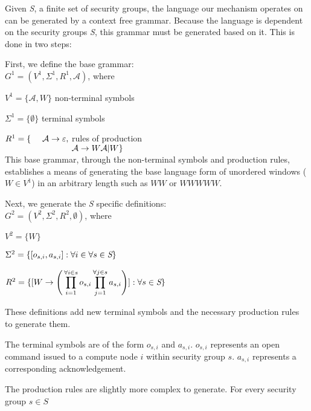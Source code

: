 \documentclass{article}
\newcommand{\tab}{\hspace*{2em}}
\begin{document}
Given \emph{S}, a finite set of security groups, the language our mechanism operates on can be generated by a context free grammar. Because the language is dependent on the security groups \emph{S}, this grammar must be generated based on it. This is done in two steps:

First, we define the base grammar:\\

\tab $G^1 = (V^1, \Sigma^1, R^1, \mathcal{A})$, where

\tab $V^1 = \{\mathcal{A} , W\}$ \hfill non-terminal symbols \hspace*{6em}

\tab $\Sigma ^1 = \{ \emptyset\}$ \hfill terminal symbols\hspace*{6.3em}

\tab $R^1 = \lbrace \hspace*{1.35em}\mathcal{A} \rightarrow \varepsilon ,$ \hfill rules of production \hspace*{6em} \\
$\tab \hspace*{5.9em} \mathcal{A}\rightarrow W\mathcal{A} |W\rbrace$\\

This base grammar, through the non-terminal symbols and production rules, establishes a means of generating the base language form of unordered windows ($W\in V^1$) in an arbitrary length such as $WW$ or $WWWWW$.

Next, we generate the \emph{S} specific definitions:\\


\tab $G^2 = (V^2, \Sigma^2, R^2, \emptyset)$, where

\tab $V^2 =\{W\}$

\tab $\Sigma ^2 = \{[o_{s,i}, a_{s,i}]:\forall i \in \forall s\in \emph{S}\}$

\tab $R^2 = \{[W\rightarrow \Bigg (\displaystyle \prod_{i=1}^{\forall i\in s} o_{s,i} \displaystyle \prod_{j=1}^{\forall j\in s} a_{s,i}\Bigg ) ] :\forall s\in \emph{S}\}$


These definitions add new terminal symbols and the necessary production rules to generate them. 

The terminal symbols are of the form $o_{s,i}$ and $a_{s,i}$. $o_{s,i}$ represents an open command issued to a compute node $i$ within security group $s$. $a_{s,i}$ represents a corresponding acknowledgement.

The production rules are slightly more complex to generate. For every security group $s\in S$
\end{document}
